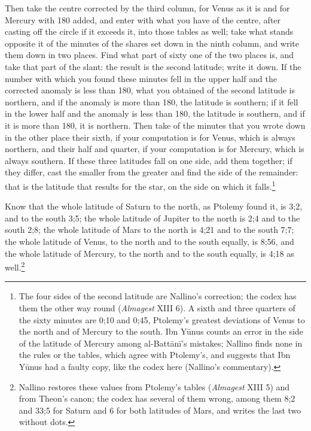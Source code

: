 \documentclass[11pt]{article}
\begin{document}
\par Then take the centre corrected by the third column, for Venus as it is and for Mercury with 180 added, and enter with what you have of the centre, after casting off the circle if it exceeds it, into those tables as well; take what stands opposite it of the minutes of the shares set down in the ninth column, and write them down in two places. Find what part of sixty one of the two places is, and take that part of the slant: the result is the second latitude; write it down. If the number with which you found these minutes fell in the upper half and the corrected anomaly is less than 180, what you obtained of the second latitude is northern, and if the anomaly is more than 180, the latitude is southern; if it fell in the lower half and the anomaly is less than 180, the latitude is southern, and if it is more than 180, it is northern. Then take of the minutes that you wrote down in the other place their sixth, if your computation is for Venus, which is always northern, and their half and quarter, if your computation is for Mercury, which is always southern. If these three latitudes fall on one side, add them together; if they differ, cast the smaller from the greater and find the side of the remainder: that is the latitude that results for the star, on the side on which it falls.\footnote{The four sides of the second latitude are Nallino's correction; the codex has them the other way round (\emph{Almagest} XIII 6). A sixth and three quarters of the sixty minutes are 0;10 and 0;45, Ptolemy's greatest deviations of Venus to the north and of Mercury to the south. Ibn Yūnus counts an error in the side of the latitude of Mercury among al-Battānī's mistakes; Nallino finds none in the rules or the tables, which agree with Ptolemy's, and suggests that Ibn Yūnus had a faulty copy, like the codex here (Nallino's commentary).}\par
\par Know that the whole latitude of Saturn to the north, as Ptolemy found it, is 3;2, and to the south 3;5; the whole latitude of Jupiter to the north is 2;4 and to the south 2;8; the whole latitude of Mars to the north is 4;21 and to the south 7;7; the whole latitude of Venus, to the north and to the south equally, is 8;56, and the whole latitude of Mercury, to the north and to the south equally, is 4;18 as well.\footnote{Nallino restores these values from Ptolemy's tables (\emph{Almagest} XIII 5) and from Theon's canon; the codex has several of them wrong, among them 8;2 and 33;5 for Saturn and 6 for both latitudes of Mars, and writes the last two without dots.}\par
\end{document}
